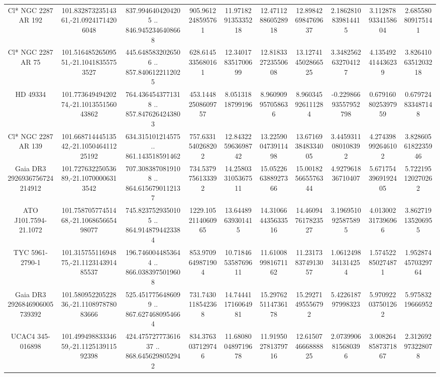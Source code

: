 \begin{table}
\begin{tabular}{cccccccccc}
Cl* NGC 2287     AR     192 & 101.83287323514361,-21.09241714206048 & 837.9946404204205 .. 846.9452346408668 & 905.9612248595761 & 11.971829135335218 & 12.471128860528918 & 12.898426984769637 & 2.1862810839814415 & 3.1128789334158604 & 2.685580809175141 \\
Cl* NGC 2287     AR      75 & 101.51648526509551,-21.10418355753527 & 445.6485832026506 .. 857.8406122112025 & 628.6145335680161 & 12.340178351700699 & 12.818332723550608 & 13.127414502866525 & 3.3482562632704127 & 4.135492414436239 & 3.8264106351203218 \\
HD  49334 & 101.77364949420274,-21.101355156043862 & 764.4364543771318 .. 857.8476264243803 & 453.14482508609757 & 8.05131818799196 & 8.960909957058636 & 8.960345926111284 & -0.22986693557952798 & 0.6791608025397959 & 0.679724833487148 \\
Cl* NGC 2287     AR     139 & 101.66871444513542,-21.105046411225192 & 634.315101214575 .. 861.143518591462 & 757.6331540268202 & 12.843225963698742 & 13.225900473911498 & 13.671693848334005 & 3.4459311080108392 & 4.274398992646102 & 3.8286056182235946 \\
Gaia DR3 2926936756724214912 & 101.72763225053689,-21.10700006313542 & 707.3083870819108 .. 864.6156790112137 & 734.5379756133392 & 14.258033105367511 & 15.052266388927366 & 15.001825665576344 & 4.927961836710407 & 5.6717543969192405 & 5.722195120270262 \\
ATO J101.7594-21.1072 & 101.75870577451468,-21.106865665498077 & 745.8237529350105 .. 864.9148794423384 & 1229.1052114060965 & 13.64489639301415 & 14.310664435633516 & 14.460947617823527 & 3.1969510925875895 & 4.013002317396966 & 3.862719135206955 \\
TYC 5961-2790-1 & 101.31575511694875,-21.112314391485537 & 196.7460044853644 .. 866.0383975019608 & 853.9709649871904 & 10.718465358769611 & 11.610089981671162 & 11.231738374913057 & 1.0612498341314254 & 1.574522850274871 & 1.9528744570329764 \\
Gaia DR3 2926846906005739392 & 101.58095220522836,-21.110897878083666 & 525.4517756486099 .. 867.6274680954664 & 731.7430118542368 & 14.744411716064981 & 15.297625114736178 & 15.29271495556792 & 5.422618797998323 & 5.970922037501262 & 5.97583219666952 \\
UCAC4 345-016898 & 101.49949883334659,-21.112513911592398 & 424.47572777361637 .. 868.6456298052942 & 834.3763037129746 & 11.680800489719678 & 11.919502781379716 & 12.615074666888825 & 2.0739906815680396 & 3.0082648587371867 & 2.312692973228078 \\

\end{tabular}
\end{table}
